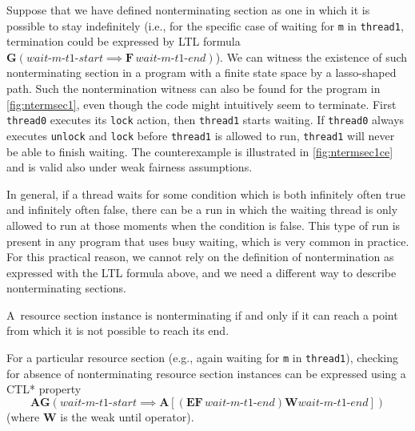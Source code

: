 Suppose that we have defined nonterminating section as one in which it is possible to stay indefinitely (i.e., for the specific case of waiting for \texttt{m} in \texttt{thread1}, termination could be expressed by LTL formula $\mathbf{G}(\textit{wait-m-t1-start} \implies \mathbf{F}\,\textit{wait-m-t1-end})$).
We can witness the existence of such nonterminating section in a program with a finite state
space by a lasso-shaped path. Such the nontermination witness can also be found
for the program in \autoref{fig:ntermsec1}, even though the code might intuitively seem to
terminate.
First \texttt{thread0} executes its \texttt{lock} action, then \texttt{thread1} starts waiting.
If \texttt{thread0} always executes \texttt{unlock} and \texttt{lock} before
\texttt{thread1} is allowed to run, \texttt{thread1} will never be able to finish waiting.
The counterexample is illustrated in \autoref{fig:ntermsec1ce} and is valid also under weak fairness assumptions.

In general, if a thread waits for some condition which is both infinitely often true and infinitely often false, there can be a run in which the waiting thread is only allowed to run at those moments when the condition is false. This type of run is present in any program that uses busy waiting, which is very common in practice.
For this practical reason, we
cannot rely on the definition of nontermination as expressed with the LTL
formula above, and we need a different way to describe nonterminating sections.

\begin{definition}\label{def:lnterm}
A~resource section instance is nonterminating if and only if it can reach a point from which it is not possible to reach its end.
\end{definition}

For a particular resource section (e.g., again waiting for \texttt{m} in \texttt{thread1}), checking for absence of nonterminating resource section instances can be expressed using a CTL* property \[ \mathbf{AG}\left(\textit{wait-m-t1-start} \implies \mathbf{A}[(\mathbf{EF}\,\textit{wait-m-t1-end}) \mathbin{\mathbf{W}} \textit{wait-m-t1-end}]\right) \] (where $\mathbf{W}$ is the weak until operator).

